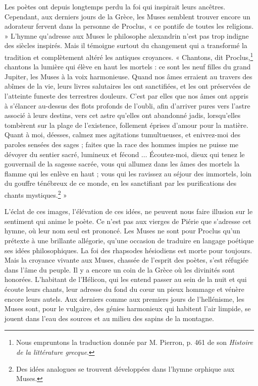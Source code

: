 \documentclass[landscape, a4paper, 11pt, oneside, polutonikogreek, french]{article}
\begin{document}
Les poètes ont depuis longtemps perdu la foi qui inspirait leurs ancêtres. Cependant, aux derniers jours de la Grèce, les Muses semblent trouver encore un adorateur fervent dans la personne de Proclus, « ce pontife de toutes les religions. » L'hymne qu'adresse aux Muses le philosophe alexandrin n'est pas trop indigne des siècles inspirés. Mais il témoigne surtout du changement qui a transformé la tradition et complètement altéré les antiques croyances. « Chantons, dit Proclus,\footnote{Nous empruntons la traduction donnée par M. Pierron, p. 461 de son \emph{Histoire de la littérature grecque}.} chantons la lumière qui élève en haut les mortels : ce sont les neuf filles du grand Jupiter, les Muses à la voix harmonieuse. Quand nos âmes erraient au travers des abîmes de la vie, leurs livres salutaires les ont sanctifiées, et les ont préservées de l'atteinte funeste des terrestres douleurs. C'est par elles que nos âmes ont appris à s'élancer au-dessus des flots profonds de l'oubli, afin d'arriver pures vers l'astre associé à leurs destins, vers cet astre qu'elles ont abandonné jadis, lorsqu'elles tombèrent sur la plage de l'existence, follement éprises d'amour pour la matière. Quant à moi, déesses, calmez mes agitations tumultueuses, et enivrez-moi des paroles sensées des sages ; faites que la race des hommes impies ne puisse me dévoyer du sentier sacré, lumineux et fécond ... Écoutez-moi, dieux qui tenez le gouvernail de la sagesse sacrée, vous qui allumez dans les âmes des mortels la flamme qui les enlève en haut ; vous qui les ravissez au séjour des immortels, loin du gouffre ténébreux de ce monde, en les sanctifiant par les purifications des chants mystiques.\footnote{Des idées analogues se trouvent développées dans l'hymne orphique aux Muses.} »

L'éclat de ces images, l'élévation de ces idées, ne peuvent nous faire illusion sur le sentiment qui anime le poète. Ce n'est pas aux vierges de Piérie que s'adresse cet hymne, où leur nom seul est prononcé. Les Muses ne sont pour Proclus qu'un prétexte à une brillante allégorie, qu'une occasion de traduire en langage poétique ses idées philosophiques. La foi des rhapsodes hésiodiens est morte pour toujours. Mais la croyance vivante aux Muses, chassée de l'esprit des poètes, s'est réfugiée dans l'âme du peuple. Il y a encore un coin de la Grèce où les divinités sont honorées. L'habitant de l'Hélicon, qui les entend passer au sein de la nuit et qui écoute leurs chants, leur adresse du fond du cœur un pieux hommage et vénère encore leurs autels. Aux derniers comme aux premiers jours de l'hellénisme, les Muses sont, pour le vulgaire, des génies harmonieux qui habitent l'air limpide, se jouent dans l'eau des sources et au milieu des sapins de la montagne.
\clearpage
\end{document}
